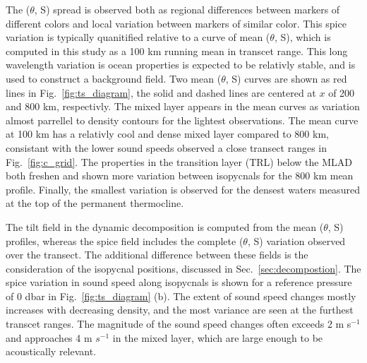 \documentclass[preprint,NumberedRefs]{JASA}
\begin{document}
The ($\theta$, S) spread is observed both as regional differences between markers of different colors and local variation between markers of similar color. This spice variation is typically quanitified relative to a curve of mean ($\theta$, S), which is computed in this study as a 100 km running mean in transcet range. This long wavelength variation is ocean properties is expected to be relativly stable, and is used to construct a background field\cite{dzieciuch2004}. Two mean ($\theta$, S) curves are shown as red lines in Fig.~\ref{fig:ts_diagram}, the solid and dashed lines are centered at $x$ of 200 and 800 km, respectivly. The mixed layer appears in the mean curves as variation almost parrellel to density contours for the lightest observations. The mean curve at 100 km has a relativly cool and dense mixed layer compared to 800 km, consistant with the lower sound speeds observed a close transect ranges in Fig.~\ref{fig:c_grid}. The properties in the transition layer (TRL) below the MLAD both freshen and shown more variation between isopycnals for the 800 km mean profile. Finally, the smallest variation is observed for the densest waters measured at the top of the permanent thermocline\cite{cole2010seasonal}.

The tilt field in the dynamic decomposition is computed from the mean ($\theta$, S) profiles, whereas the spice field includes the complete ($\theta$, S) variation observed over the transect. The additional difference between these fields is the consideration of the isopycnal positions, discussed in Sec.~\ref{sec:decompostion}. The spice variation in sound speed along isopycnals is shown for a reference pressure of 0 dbar in Fig.~\ref{fig:ts_diagram} (b). The extent of sound speed changes mostly increases with decreasing density, and the most variance are seen at the furthest transcet ranges. The magnitude of the sound speed changes often exceeds 2 m s$^{-1}$ and approaches 4 m $s^{-1}$ in the mixed layer, which are large enough to be acoustically relevant.

\end{document}
